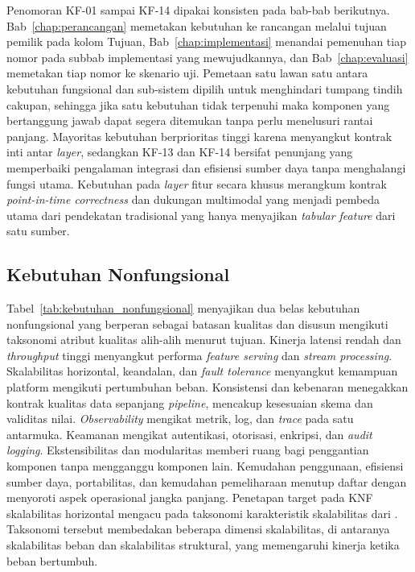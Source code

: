 

Penomoran KF-01 sampai KF-14 dipakai konsisten pada bab-bab berikutnya. Bab~\ref{chap:perancangan} memetakan kebutuhan ke rancangan melalui tujuan pemilik pada kolom Tujuan, Bab~\ref{chap:implementasi} menandai pemenuhan tiap nomor pada subbab implementasi yang mewujudkannya, dan Bab~\ref{chap:evaluasi} memetakan tiap nomor ke skenario uji. Pemetaan satu lawan satu antara kebutuhan fungsional dan sub-sistem dipilih untuk menghindari tumpang tindih cakupan, sehingga jika satu kebutuhan tidak terpenuhi maka komponen yang bertanggung jawab dapat segera ditemukan tanpa perlu menelusuri rantai panjang. Mayoritas kebutuhan berprioritas tinggi karena menyangkut kontrak inti antar \textit{layer}, sedangkan KF-13 dan KF-14 bersifat penunjang yang memperbaiki pengalaman integrasi dan efisiensi sumber daya tanpa menghalangi fungsi utama. Kebutuhan pada \textit{layer} fitur secara khusus merangkum kontrak \textit{point-in-time correctness} dan dukungan multimodal yang menjadi pembeda utama dari pendekatan tradisional yang hanya menyajikan \textit{tabular feature} dari satu sumber.

\subsection{Kebutuhan Nonfungsional}
\label{subsec:knf}

Tabel~\ref{tab:kebutuhan_nonfungsional} menyajikan dua belas kebutuhan nonfungsional yang berperan sebagai batasan kualitas dan disusun mengikuti taksonomi atribut kualitas alih-alih menurut tujuan. Kinerja latensi rendah dan \textit{throughput} tinggi menyangkut performa \textit{feature serving} dan \textit{stream processing}. Skalabilitas horizontal, keandalan, dan \textit{fault tolerance} menyangkut kemampuan platform mengikuti pertumbuhan beban. Konsistensi dan kebenaran menegakkan kontrak kualitas data sepanjang \textit{pipeline}, mencakup kesesuaian skema dan validitas nilai. \textit{Observability} mengikat metrik, log, dan \textit{trace} pada satu antarmuka. Keamanan mengikat autentikasi, otorisasi, enkripsi, dan \textit{audit logging}. Ekstensibilitas dan modularitas memberi ruang bagi penggantian komponen tanpa mengganggu komponen lain. Kemudahan penggunaan, efisiensi sumber daya, portabilitas, dan kemudahan pemeliharaan menutup daftar dengan menyoroti aspek operasional jangka panjang. Penetapan target pada KNF skalabilitas horizontal mengacu pada taksonomi karakteristik skalabilitas dari \textcite{bondi2000characteristics}. Taksonomi tersebut membedakan beberapa dimensi skalabilitas, di antaranya skalabilitas beban dan skalabilitas struktural, yang memengaruhi kinerja ketika beban bertumbuh.

